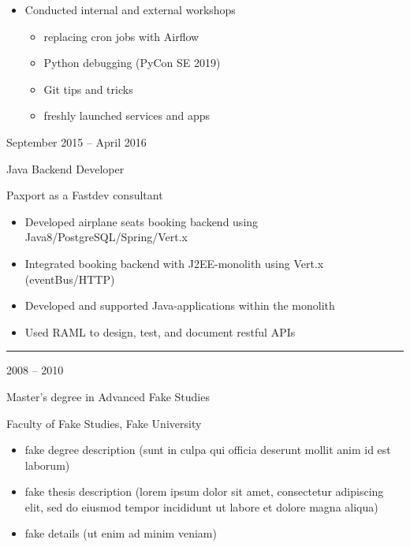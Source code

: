 \documentclass[a4paper,10pt]{article}
\newlength{\cvcolumngapwidth}
\newlength{\cvleftcolumnwidth}
\newlength{\cvrightcolumnwidth}
\newcommand{\cvsectionstyle}[1]{{\normalsize\cvsectionfont\textcolor{cvsectioncolor}{#1}}}
\newcommand{\cvtitlestyle}[1]{{\large\cvtitlefont\textcolor{cvtitlecolor}{#1}}}
\newcommand{\cvdurationstyle}[1]{{\small\cvdurationfont\textcolor{cvdurationcolor}{#1}}}
\newlength{\cvafteritemskipamount}
\newlength{\cvaftersectionskipamount}
\newlength{\cvaftertitleskipamount}
\newlength{\cvparskip}
\newcommand{\cvsection}[1]{
    \begin{minipage}[t]{\cvleftcolumnwidth}
        \raggedleft\cvsectionstyle{#1}
    \end{minipage}%
    \hspace{\cvcolumngapwidth}%
    \begin{minipage}[t]{\cvrightcolumnwidth}
        \textcolor{cvrulecolor}{\rule{\cvrightcolumnwidth}{0.3mm}}
    \end{minipage}

    \vspace{\cvaftersectionskipamount}
}
\newcommand{\cvitem}[2]{
    \begin{minipage}[t]{\cvleftcolumnwidth}
        \raggedleft #1
    \end{minipage}%
    \hspace{\cvcolumngapwidth}%
    \begin{minipage}[t]{\cvrightcolumnwidth}
        \setlength{\parskip}{\cvparskip} #2
    \end{minipage}

    \vspace{\cvafteritemskipamount}
}
\newcommand{\cvtitle}[1]{
    \cvtitlestyle{#1}

    \vspace{\cvaftertitleskipamount}
    \vspace{-\cvparskip}
}
\begin{document}
{    %

    \begin{itemize}[leftmargin=*]
        \item Conducted internal and external workshops
	    \begin{itemize}[leftmargin=*]
		  \item replacing cron jobs with Airflow
		  \item Python debugging (PyCon SE 2019)
		  \item Git tips and tricks
		  \item freshly launched services and apps
	    \end{itemize}
    \end{itemize}

}

\cvitem{
    \cvdurationstyle{September 2015 -- April 2016}
}{
    \cvtitle{Java Backend Developer}

    Paxport as a Fastdev consultant

    \begin{itemize}[leftmargin=*]
	\item Developed airplane seats booking backend using Java8/PostgreSQL/Spring/Vert.x
	\item Integrated booking backend with J2EE-monolith using Vert.x (eventBus/HTTP)
	\item Developed and supported Java-applications within the monolith
	\item Used RAML to design, test, and document restful APIs
    \end{itemize}
}



\cvsection{EDUCATION}

\cvitem{
    \cvdurationstyle{2008 -- 2010}
}{
    \cvtitle{Master's degree in Advanced Fake Studies}

    Faculty of Fake Studies, Fake University

    \begin{itemize}[leftmargin=*]
        \item fake degree description (sunt in culpa qui officia deserunt mollit anim id est laborum)
        \item fake thesis description (lorem ipsum dolor sit amet, consectetur adipiscing elit, sed do eiusmod tempor
              incididunt ut labore et dolore magna aliqua)
        \item fake details (ut enim ad minim veniam)
    \end{itemize}
}
\end{document}
